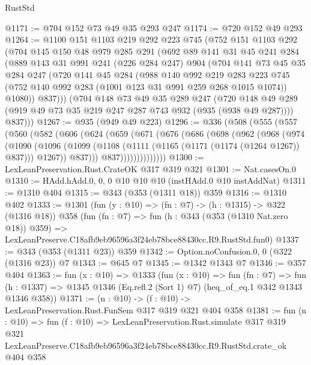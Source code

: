 \begin{lexlean}{RustStd}
\begin{coremodule}
@1171 := @704 @152 @73 @49 @35 @293 @247
@1174 := @720 @152 @49 @293
@1264 := @1100
    @151
    @1103
    @219
    @292
    @223
    @745
    (@752
      @151
      @1103
      @292
      (@704
        @145
        @150
        @48
        @979
        @285
        @291
        (@692
          @89
          @141
          @31
          @45
          @241
          @284
          (@889
            @143
            @31
            @991
            @241
            (@226 @284 @247)
            @904
            (@704
              @141
              @73
              @45
              @35
              @284
              @247
              (@720
                @141
                @45
                @284
                (@988
                  @140
                  @992
                  @219
                  @283
                  @223
                  @745
                  (@752 @140 @992 @283 (@1001 @123 @31 @991 @259 @268 @1015 @1074))
                  @1080))
              @837)))
        (@704
          @148
          @73
          @49
          @35
          @289
          @247
          (@720 @148 @49 @289 (@919 @49 @73 @35 @219 @247 @287 @743 @932 (@935 (@938 @49 @287))))
          @837)))
@1267 := @935 (@949 @49 @223)
@1296 := @336
    (@508
      (@555
        (@557
          (@560
            (@582
              (@606
                (@624
                  (@659
                    (@671
                      (@676
                        (@686
                          (@698
                            (@962
                              (@968
                                (@974
                                  (@1090
                                    (@1096
                                      (@1099
                                        (@1108
                                          (@1111 (@1165 (@1171 (@1174 (@1264 @1267)) @837)))
                                          @1267))
                                      @837)))
                                @837))))))))))))))
@1300 := LexLeanPreservation.Rust.CrateOK @317 @319 @321
@1301 := Nat.casesOn.{0}
@1310 := HAdd.hAdd.{0, 0, 0} @10 @10 @10 (instHAdd.{0} @10 instAddNat)
@1311 := @1310 @404
@1315 := @343 (@353 (@1311 @18)) @359
@1316 := @1310 @402
@1333 := @1301
    (fun (y : @10) => (fn : @7) -> (h : @1315) -> @322 (@1316 @18))
    @358
    (fun (fn : @7) =>
    fun (h : @343 (@353 (@1310 Nat.zero @18)) @359) =>
    LexLeanPreserve.C18afb9eb96596a3f24eb78bce88430cc.R9.RustStd.fun0)
@1337 := @343 (@353 (@1311 @23)) @359
@1342 := Option.noConfusion.{0, 0} (@322 (@1316 @23)) @7
@1343 := @645 @7
@1345 := @1342 @1343 @7
@1346 := @357 @404
@1363 := fun (x : @10) =>
  @1333
    (fun (x : @10) =>
    fun (fn : @7) =>
    fun (h : @1337) => @1345 @1346 (Eq.refl.{2} (Sort 1) @7) (heq_of_eq.{1} @342 @1343 @1346 @358))
@1371 := (n : @10) -> (f : @10) -> LexLeanPreservation.Rust.FunSem @317 @319 @321 @404 @358
@1381 := fun (n : @10) =>
  fun (f : @10) =>
  LexLeanPreservation.Rust.simulate
    @317
    @319
    @321
    LexLeanPreserve.C18afb9eb96596a3f24eb78bce88430cc.R9.RustStd.crate_ok
    @404
    @358
\end{coremodule}
\end{lexlean}
